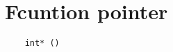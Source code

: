 \documentclass{article}
\begin{document}
\title{}
\author{Wang Xiyu}
\date{}
\maketitle
\section{Fcuntion pointer}
\begin{lstlisting}
    int* ()
\end{lstlisting}
\end{document}
